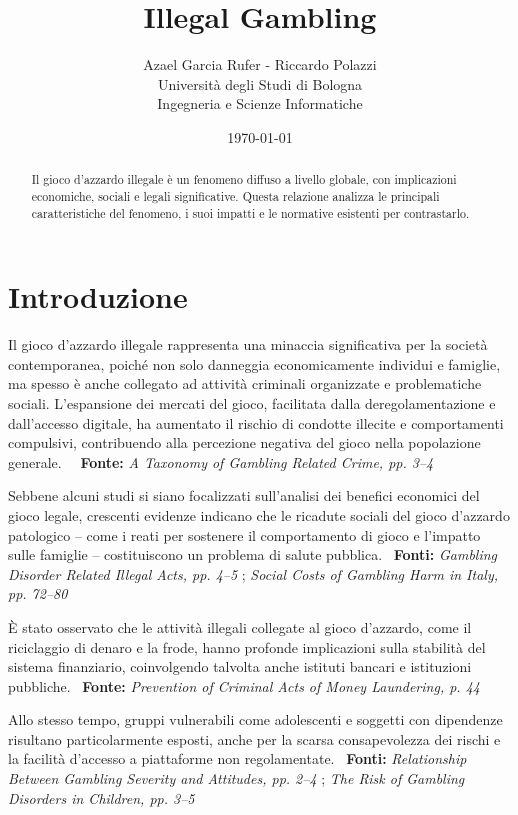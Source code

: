 \documentclass[a4paper,12pt]{article}
\title{\textbf{Illegal Gambling}}
\author{Azael Garcia Rufer - Riccardo Polazzi \\ Università degli Studi di Bologna \\ Ingegneria e Scienze Informatiche}
\date{\today}
\begin{document}
\maketitle

\begin{abstract}
Il gioco d'azzardo illegale è un fenomeno diffuso a livello globale, con implicazioni economiche, sociali e legali significative. Questa relazione analizza le principali caratteristiche del fenomeno, i suoi impatti e le normative esistenti per contrastarlo.
\end{abstract}

\newpage
\tableofcontents
\newpage

\section{Introduzione}

Il gioco d’azzardo illegale rappresenta una minaccia significativa per la società contemporanea, poiché non solo danneggia economicamente individui e famiglie, ma spesso è anche collegato ad attività criminali organizzate e problematiche sociali. L’espansione dei mercati del gioco, facilitata dalla deregolamentazione e dall’accesso digitale, ha aumentato il rischio di condotte illecite e comportamenti compulsivi, contribuendo alla percezione negativa del gioco nella popolazione generale. \ \ \textbf{Fonte:} \textit{A Taxonomy of Gambling Related Crime, pp. 3--4} \cite{banks2018taxonomy}

Sebbene alcuni studi si siano focalizzati sull’analisi dei benefici economici del gioco legale, crescenti evidenze indicano che le ricadute sociali del gioco d’azzardo patologico – come i reati per sostenere il comportamento di gioco e l’impatto sulle famiglie – costituiscono un problema di salute pubblica. \ \textbf{Fonti:} \textit{Gambling Disorder Related Illegal Acts, pp. 4--5} \cite{gorsane2017illegalacts}; \textit{Social Costs of Gambling Harm in Italy, pp. 72--80} \cite{lucchini2022socialcosts}

È stato osservato che le attività illegali collegate al gioco d’azzardo, come il riciclaggio di denaro e la frode, hanno profonde implicazioni sulla stabilità del sistema finanziario, coinvolgendo talvolta anche istituti bancari e istituzioni pubbliche. \ \textbf{Fonte:} \textit{Prevention of Criminal Acts of Money Laundering, p. 44} \cite{tarina2019moneylaundering}

Allo stesso tempo, gruppi vulnerabili come adolescenti e soggetti con dipendenze risultano particolarmente esposti, anche per la scarsa consapevolezza dei rischi e la facilità d’accesso a piattaforme non regolamentate. \ \textbf{Fonti:} \textit{Relationship Between Gambling Severity and Attitudes, pp. 2--4} \cite{gori2014adolescentgambling}; \textit{The Risk of Gambling Disorders in Children, pp. 3--5} \cite{ferrara2019childrenrisk}
\end{document}
